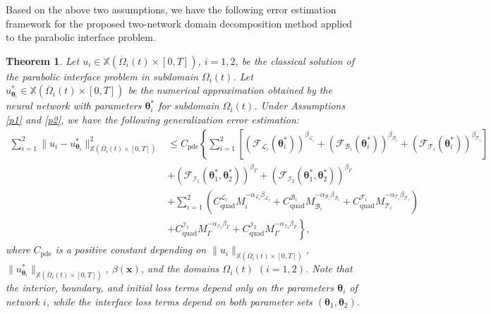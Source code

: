 \documentclass{article}
\newtheorem{theorem}{Theorem}[section]
\begin{document}
Based on the above two assumptions, we have the following error estimation framework for the proposed two-network domain decomposition method applied to the parabolic interface problem.

\begin{theorem}
Let $u_i \in \mathbb{X}(\overline{\Omega}_i(t) \times [0, T])$, $i = 1, 2$, be the classical solution of the parabolic interface problem in subdomain $\Omega_i(t)$. Let $u_{\boldsymbol{\theta}_i}^{*} \in \mathbb{X}(\overline{\Omega}_i(t) \times [0, T])$ be the numerical approximation obtained by the neural network with parameters $\boldsymbol{\theta}_i^*$ for subdomain $\Omega_i(t)$. Under Assumptions \ref{p1} and \ref{p2}, we have the following generalization error estimation:
\begin{equation}
\begin{aligned}
    \sum_{i=1}^{2} \|u_i - u_{\boldsymbol{\theta}_i}^{*}\|^2_{\mathbb{X}(\overline{\Omega}_i(t) \times [0,T])} &\leq C_{\text{pde}} \left\{ \sum_{i=1}^{2} \left[ (\mathcal{F}_{\mathcal{L}_i}(\boldsymbol{\theta}_i^*))^{\beta_{\mathcal{L}_i}} + (\mathcal{F}_{\mathcal{B}_i}(\boldsymbol{\theta}_i^*))^{\beta_{\mathcal{B}_i}} + (\mathcal{F}_{\mathcal{T}_i}(\boldsymbol{\theta}_i^*))^{\beta_{\mathcal{T}_i}} \right] \right.\\
&\left.+ (\mathcal{F}_{\mathcal{I}_1}(\boldsymbol{\theta}_1^*, \boldsymbol{\theta}_2^*))^{\beta_{\Gamma}}  + (\mathcal{F}_{\mathcal{I}_2}(\boldsymbol{\theta}_1^*, \boldsymbol{\theta}_2^*))^{\beta_{\Gamma}} \right.\\
&\left. + \sum_{i=1}^{2} \left( C_{\text{quad}}^{\mathcal{L}_i}M_{i}^{-\alpha_{\mathcal{L}_i}\beta_{\mathcal{L}_i}} + C_{\text{quad}}^{\mathcal{B}_i}M_{\mathcal{B}_i}^{-\alpha_{\mathcal{B}_i}\beta_{\mathcal{B}_i}} + C_{\text{quad}}^{\mathcal{T}_i}M_{\mathcal{T}_i}^{-\alpha_{\mathcal{T}_i}\beta_{\mathcal{T}_i}}  \right) \right.\\
&\left. + C_{\text{quad}}^{\mathcal{I}_1}M_{\Gamma}^{-\alpha_{\mathcal{I}_1}\beta_{\Gamma}} + C_{\text{quad}}^{{\mathcal{I}_2}}M_{\Gamma}^{-\alpha_{\mathcal{I}_2}\beta_{\Gamma}} \right\},
\end{aligned}
\end{equation}
where $C_{\text{pde}}$ is a positive constant depending on $\|u_i\|_{\mathbb{X}(\overline{\Omega}_i(t) \times [0,T])}$, $\|u_{\boldsymbol{\theta}_i}^{*}\|_{\mathbb{X}(\overline{\Omega}_i(t) \times [0,T])}$, $\beta(\boldsymbol{x})$, and the domains $\Omega_i(t)$ $(i = 1, 2)$. Note that the interior, boundary, and initial loss terms depend only on the parameters $\boldsymbol{\theta}_i$ of network $i$, while the interface loss terms depend on both parameter sets $(\boldsymbol{\theta}_1, \boldsymbol{\theta}_2)$.
\end{theorem}
\end{document}
